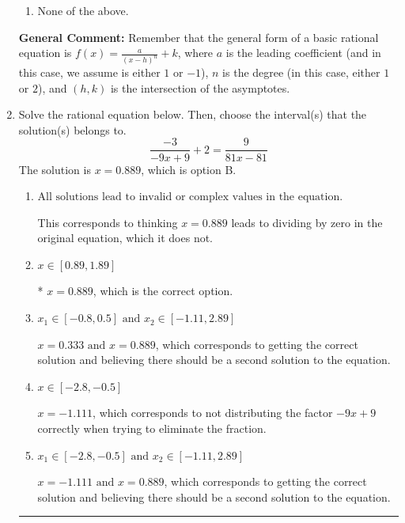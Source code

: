 \documentclass{extbook}[14pt]
\newcommand{\litem}[1]{\item #1

\rule{\textwidth}{0.4pt}}
\begin{document}
\begin{enumerate}
{\begin{enumerate}[label=\Alph*.]
\item None of the above.\end{enumerate}
\textbf{General Comment:} Remember that the general form of a basic rational equation is $ f(x) = \frac{a}{(x-h)^n} + k$, where $a$ is the leading coefficient (and in this case, we assume is either $1$ or $-1$), $n$ is the degree (in this case, either $1$ or $2$), and $(h, k)$ is the intersection of the asymptotes.
}
\litem{
Solve the rational equation below. Then, choose the interval(s) that the solution(s) belongs to.
\[ \frac{-3}{-9x + 9} + 2 = \frac{9}{81x -81} \]The solution is \( x = 0.889 \), which is option B.\begin{enumerate}[label=\Alph*.]
\item \( \text{All solutions lead to invalid or complex values in the equation.} \)

This corresponds to thinking $x = 0.889$ leads to dividing by zero in the original equation, which it does not.
\item \( x \in [0.89,1.89] \)

* $x = 0.889$, which is the correct option.
\item \( x_1 \in [-0.8, 0.5] \text{ and } x_2 \in [-1.11,2.89] \)

$x = 0.333 \text{ and } x = 0.889$, which corresponds to getting the correct solution and believing there should be a second solution to the equation.
\item \( x \in [-2.8,-0.5] \)

$x = -1.111$, which corresponds to not distributing the factor $-9x + 9$ correctly when trying to eliminate the fraction.
\item \( x_1 \in [-2.8, -0.5] \text{ and } x_2 \in [-1.11,2.89] \)

$x = -1.111 \text{ and } x = 0.889$, which corresponds to getting the correct solution and believing there should be a second solution to the equation.
\end{enumerate}

}
\end{enumerate}
\end{document}
